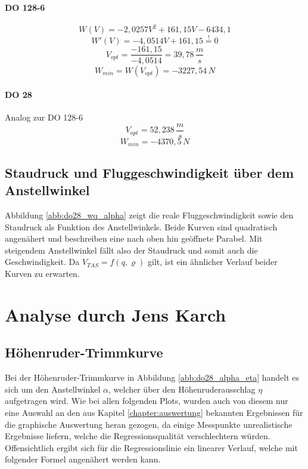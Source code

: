 \paragraph{DO 128-6}
\begin{equation*}
W(V)=-2,0257V^2+161,15V-6434,1
\end{equation*}
\begin{equation*}
W'(V)=-4,0514V+161,15\overset{!}{=}0
\end{equation*}
\begin{equation*}
V_{opt}=\frac{-161,15}{-4,0514}=39,78 \, \frac{m}{s}
\end{equation*}
\begin{equation*}
W_{min}=W(V_{opt}) = -3227,54 \,N
\end{equation*}
\paragraph{DO 28} Analog zur DO 128-6
\begin{equation*}
V_{opt}=52,238 \, \frac{m}{s}
\end{equation*}
\begin{equation*}
W_{min}=-4370,5\, N
\end{equation*}
\vspace{3mm}
\subsection{Staudruck und Fluggeschwindigkeit über dem Anstellwinkel}
Abbildung \ref{abb:do28_wq_alpha} zeigt die reale Fluggeschwindigkeit sowie den Staudruck als Funktion des Anstellwinkels. Beide Kurven sind quadratisch angenähert und beschreiben eine nach oben hin geöffnete Parabel. Mit steigendem Anstellwinkel fällt also der Staudruck und somit auch die Geschwindigkeit. Da $V_{TAS} = f(q,\varrho)$ gilt, ist ein ähnlicher Verlauf beider Kurven zu erwarten. 
\newpage

\section{Analyse durch Jens Karch}
\subsection{Höhenruder-Trimmkurve}
Bei der Höhenruder-Trimmkurve in Abbildung \ref{abb:do28_alpha_eta} handelt es sich um den Anstellwinkel $\alpha$, welcher über den Höhenruderausschlag $\eta$ aufgetragen wird. Wie bei allen folgenden Plots, wurden auch von diesem nur eine Auswahl an den aus Kapitel \ref{chapter:auswertung} bekannten Ergebnissen für die graphische Auswertung heran gezogen, da einige Messpunkte unrealistische Ergebnisse liefern, welche die Regressionsqualität verschlechtern würden.\\
Offensichtlich ergibt sich für die Regressionslinie ein linearer Verlauf, welche mit folgender Formel angenähert werden kann.\\

